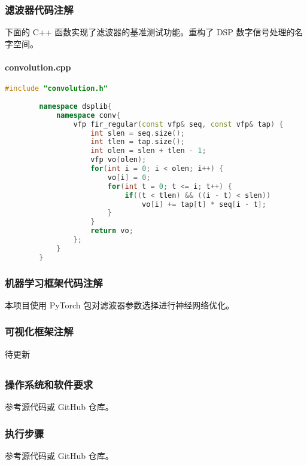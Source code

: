 \subsubsection{滤波器代码注解}

下面的 C++ 函数实现了滤波器的基准测试功能。重构了 DSP 数字信号处理的名字空间。

\paragraph{convolution.cpp}

\begin{center}
    \begin{lstlisting}[language=C++]
        #include "convolution.h"
    
        namespace dsplib{
            namespace conv{
                vfp fir_regular(const vfp& seq, const vfp& tap) {
                    int slen = seq.size();
                    int tlen = tap.size();
                    int olen = slen + tlen - 1;
                    vfp vo(olen);
                    for(int i = 0; i < olen; i++) {
                        vo[i] = 0;
                        for(int t = 0; t <= i; t++) {
                            if((t < tlen) && ((i - t) < slen))
                                vo[i] += tap[t] * seq[i - t];
                        }
                    }
                    return vo;
                };
            }
        }
    \end{lstlisting}    
\end{center}

\subsubsection{机器学习框架代码注解}

本项目使用 PyTorch 包对滤波器参数选择进行神经网络优化。

\subsubsection{可视化框架注解}

待更新

\subsection{}


\subsubsection{操作系统和软件要求}

参考源代码或 GitHub 仓库。

\subsubsection{执行步骤}

参考源代码或 GitHub 仓库。


{}